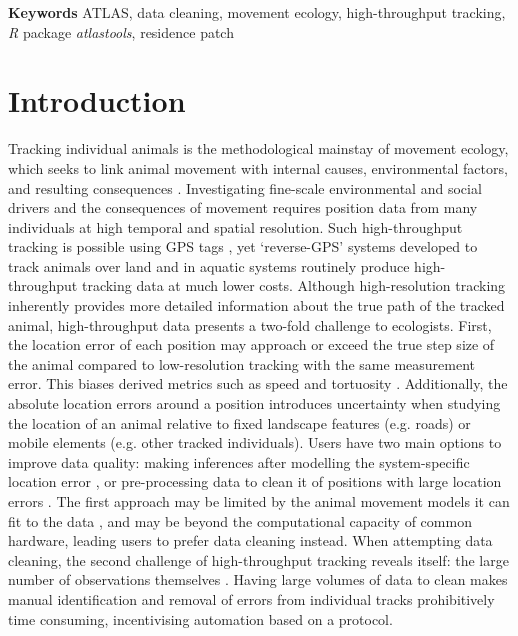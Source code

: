 \documentclass[10pt,paper=a4,headings=standardclasses
]{scrartcl}
\begin{document}
\textbf{Keywords} ATLAS, data cleaning, movement ecology, high-throughput tracking, \textit{R} package \textit{atlastools}, residence patch

\linenumbers

\section{Introduction}

Tracking individual animals is the methodological mainstay of movement ecology, which seeks to link animal movement with internal causes, environmental factors, and resulting consequences \citep{nathan2008a, holyoak2008}. 
Investigating fine-scale environmental and social drivers and the consequences of movement requires position data from many individuals at high temporal and spatial resolution.
Such high-throughput tracking is possible using GPS tags \citep[see recent examples in][]{strandburg-peshkin2015, papageorgiou2019, harel2016}, yet ‘reverse-GPS’ systems developed to track animals over land \citep{toledo2014, weiser2016, toledo2016,toledo2020, maccurdy2009, maccurdy2019} and in aquatic systems \citep{hussey2015, baktoft2019, baktoft2017,jung2015} routinely produce high-throughput tracking data at much lower costs.
Although high-resolution tracking inherently provides more detailed information about the true path of the tracked animal, high-throughput data presents a two-fold challenge to ecologists.
First, the location error of each position may approach or exceed the true step size of the animal compared to low-resolution tracking with the same measurement error.
This biases derived metrics such as speed and tortuosity \citep[see][]{ranacher2016, noonan2019, hurford2009, calenge2009}.
Additionally, the absolute location errors around a position introduces uncertainty when studying the location of an animal relative to fixed landscape features (e.g. roads) or mobile elements (e.g. other tracked individuals).
Users have two main options to improve data quality: making inferences after modelling the system-specific location error \citep{fleming2014a, fleming2020, jonsen2003, jonsen2005, johnson2008, patterson2008}, or pre-processing data to clean it of positions with large location errors \citep{bjorneraas2010}.
The first approach may be limited by the animal movement models it can fit to the data \citep{fleming2014a, noonan2019, fleming2020}, and may be beyond the computational capacity of common hardware, leading users to prefer data cleaning instead.
When attempting data cleaning, the second challenge of high-throughput tracking reveals itself: the large number of observations themselves \citep{weiser2016, toledo2020}.
Having large volumes of data to clean makes manual identification and removal of errors from individual tracks prohibitively time consuming, incentivising automation based on a protocol.
\end{document}
